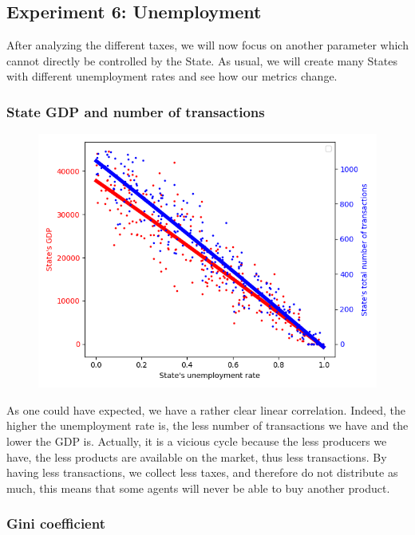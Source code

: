 {{    \subsection{Experiment 6: Unemployment}
    After analyzing the different taxes, we will now focus on another parameter which cannot directly be controlled by the State. As usual, we will create many States with different unemployment rates and see how our metrics change.

            
        \subsubsection{State GDP and number of transactions}

        \begin{figure}
            \includegraphics[width=\linewidth]{img/exp/6_1.png}
        \end{figure} 
        {As one could have expected, we have a rather clear linear correlation. Indeed, the higher the unemployment rate is, the less number of transactions we have and the lower the GDP is. Actually, it is a vicious cycle because the less producers we have, the less products are available on the market, thus less transactions. By having less transactions, we collect less taxes, and therefore do not distribute as much, this means that some agents will never be able to buy another product. 
        \par

        \subsubsection{Gini coefficient}

}}}
